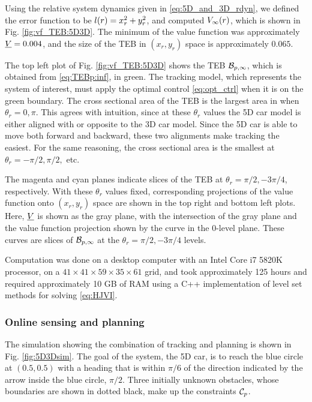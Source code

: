Using the relative system dynamics given in \eqref{eq:5D_and_3D_rdyn}, we defined the error function to be $l(r) = x_r^2 + y_r^2$, and computed $V_\infty(r)$, which is shown in Fig. \ref{fig:vf_TEB:5D3D}.
The minimum of the value function was approximately $\underline{V} = 0.004$, and the size of the TEB in $(x_r, y_r)$ space is approximately $0.065$.

The top left plot of Fig. \ref{fig:vf_TEB:5D3D} shows the TEB $\mathcal B_{p, \infty}$, which is obtained from \eqref{eq:TEBp:inf}, in green.
The tracking model, which represents the system of interest, must apply the optimal control \eqref{eq:opt_ctrl} when it is on the green boundary.
The cross sectional area of the TEB is the largest area in when $\theta_r = 0, \pi$. 
This agrees with intuition, since at these $\theta_r$ values the 5D car model is either aligned with or opposite to the 3D car model.
Since the 5D car is able to move both forward and backward, these two alignments make tracking the easiest.
For the same reasoning, the cross sectional area is the smallest at $\theta_r = -\pi/2, \pi/2,$ etc.

The magenta and cyan planes indicate slices of the TEB at $\theta_r = \pi/2, -3\pi/4$, respectively.
With these $\theta_r$ values fixed, corresponding projections of the value function onto $(x_r, y_r)$ space are shown in the top right and bottom left plots.
Here, $\underline{V}$ is shown as the gray plane, with the intersection of the gray plane and the value function projection shown by the curve in the $0$-level plane. 
These curves are slices of $\mathcal B_{p, \infty}$ at the $\theta_r = \pi/2, -3\pi/4$ levels.

Computation was done on a desktop computer with an Intel Core i7 5820K processor, on a $41\times41\times59\times35\times61$ grid, and took approximately 125 hours and required approximately 10 GB of RAM using a C++ implementation of level set methods for solving \eqref{eq:HJVI}.

\subsubsection{Online sensing and planning}
The simulation showing the combination of tracking and planning is shown in Fig. \ref{fig:5D3Dsim}.
The goal of the system, the 5D car, is to reach the blue circle at $(0.5, 0.5)$ with a heading that is within $\pi/6$ of the direction indicated by the arrow inside the blue circle, $\pi/2$.
Three initially unknown obstacles, whose boundaries are shown in dotted black, make up the constraints $\mathcal C_p$.

